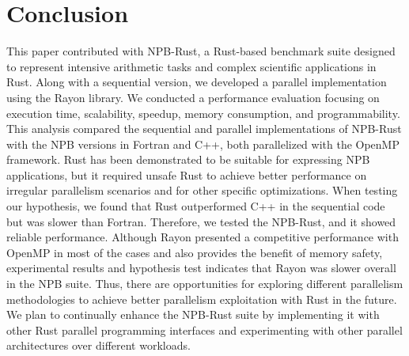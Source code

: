 
\section{Conclusion}\label{sec:conl}


This paper contributed with NPB-Rust, a Rust-based benchmark suite designed to represent intensive arithmetic tasks and complex scientific applications in Rust. Along with a sequential version, we developed a parallel implementation using the Rayon library. We conducted a performance evaluation focusing on execution time, scalability, speedup, memory consumption, and programmability. This analysis compared the sequential and parallel implementations of NPB-Rust with the NPB versions in Fortran and C++, both parallelized with the OpenMP framework. Rust has been demonstrated to be suitable for expressing NPB applications, but it required unsafe Rust to achieve better performance on irregular parallelism scenarios and for other specific optimizations. When testing our hypothesis, we found that Rust outperformed C++ in the sequential code but was slower than Fortran. Therefore, we tested the NPB-Rust, and it showed reliable performance. Although Rayon presented a competitive performance with OpenMP in most of the cases and also provides the benefit of memory safety, experimental results and hypothesis test indicates that Rayon was slower overall in the NPB suite. Thus, there are opportunities for exploring different parallelism methodologies to achieve better parallelism exploitation with Rust in the future. We plan to continually enhance the NPB-Rust suite by implementing it with other Rust parallel programming interfaces and experimenting with other parallel architectures over different workloads.


